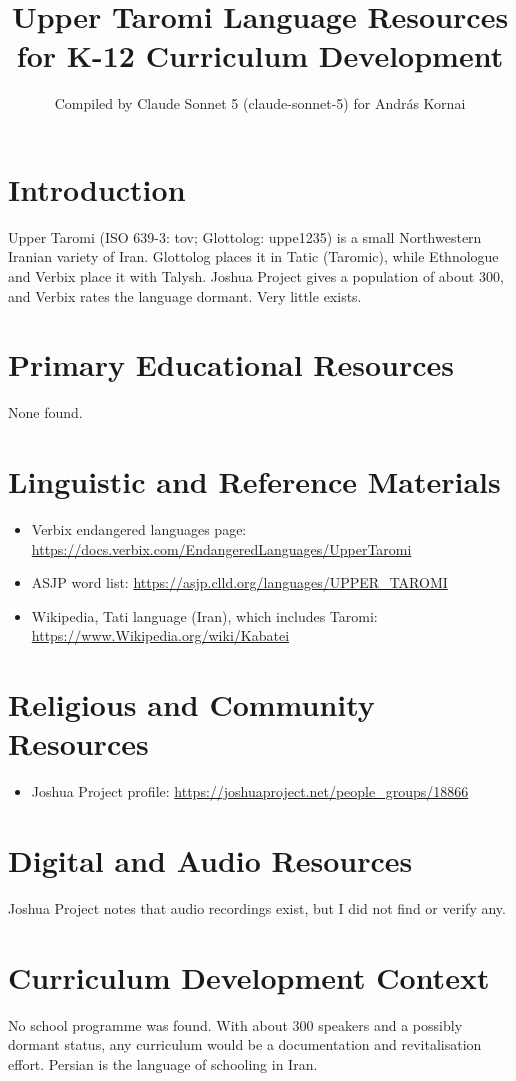 \documentclass[12pt]{article}
\title{Upper Taromi Language Resources for K-12 Curriculum Development}
\author{Compiled by Claude Sonnet 5 (claude-sonnet-5) for Andr\'as Kornai}
\date{}
\begin{document}
\maketitle

\section{Introduction}
Upper Taromi (ISO 639-3: tov; Glottolog: uppe1235) is a small Northwestern Iranian variety of Iran. Glottolog places it in Tatic (Taromic), while Ethnologue and Verbix place it with Talysh. Joshua Project gives a population of about 300, and Verbix rates the language dormant. Very little exists.

\section{Primary Educational Resources}
None found.

\section{Linguistic and Reference Materials}
\begin{itemize}
\item Verbix endangered languages page: \url{https://docs.verbix.com/EndangeredLanguages/UpperTaromi}
\item ASJP word list: \url{https://asjp.clld.org/languages/UPPER_TAROMI}
\item Wikipedia, Tati language (Iran), which includes Taromi: \url{https://www.Wikipedia.org/wiki/Kabatei}
\end{itemize}

\section{Religious and Community Resources}
\begin{itemize}
\item Joshua Project profile: \url{https://joshuaproject.net/people_groups/18866}
\end{itemize}

\section{Digital and Audio Resources}
Joshua Project notes that audio recordings exist, but I did not find or verify any.

\section{Curriculum Development Context}
No school programme was found. With about 300 speakers and a possibly dormant status, any curriculum would be a documentation and revitalisation effort. Persian is the language of schooling in Iran.
\end{document}
